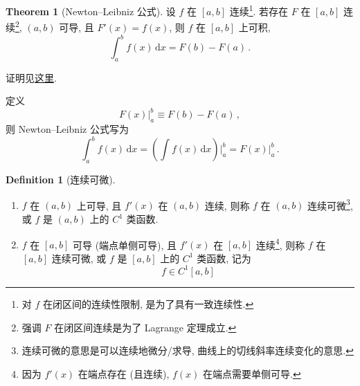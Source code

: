 \documentclass{book}
\newcommand{\dd}{\,\mathrm{d}}
\numberwithin{equation}{section}
\numberwithin{figure}{section}
\theoremstyle{definition}
\newtheorem{definition}{Definition}
\newtheorem{theorem}{Theorem}[section]
\begin{document}
\begin{theorem}[Newton--Leibniz 公式]
  设 $f$ 在 $[a,b]$ 连续\footnote{对 $f$ 在闭区间的连续性限制, 是为了具有一致连续性.}. 若存在 $F$ 在 $[a,b]$ 连续\footnote{强调 $F$ 在闭区间连续是为了 Lagrange 定理成立.}, $(a,b)$ 可导, 且 $F'(x)=f(x)$,
  则 $f$ 在 $[a,b]$ 上可积,
  \begin{equation*}
    \int_{a}^{b} f(x) \dd x=F(b)-F(a)\,.
  \end{equation*}
\end{theorem}
证明见\hyperlink{proof:NewtonLeibnizFormula}{这里}.

定义
\begin{equation*}
  F(x)|^b_a\equiv F(b)-F(a)\,,
\end{equation*}
则 Newton--Leibniz 公式写为
\begin{equation*}
  \int_{a}^{b} f(x) \dd x=\left( \int f(x)\dd x \right)\big|_a^b=F(x)|_a^b\,.
\end{equation*}

\begin{definition}[连续可微]
  \begin{enumerate}
    \item $f$ 在 $(a,b)$ 上可导, 且 $f'(x)$ 在 $(a,b)$ 连续, 则称 $f$ 在 $(a,b)$ 连续可微\footnote{连续可微的意思是可以连续地微分/求导, 曲线上的切线斜率连续变化的意思.}, 或 $f$ 是 $(a,b)$ 上的 $C^1$ 类函数.
    \item $f$ 在 $[a,b]$ 可导 (端点单侧可导), 且 $f'(x)$ 在 $[a,b]$ 连续\footnote{因为 $f'(x)$ 在端点存在 (且连续), $f(x)$ 在端点需要单侧可导.}, 则称 $f$ 在 $[a,b]$ 连续可微, 或 $f$ 是 $[a,b]$ 上的 $C^1$ 类函数, 记为
      \begin{equation*}
	f\in C^1[a,b]
      \end{equation*}
  \end{enumerate}
\end{definition}
\end{document}
